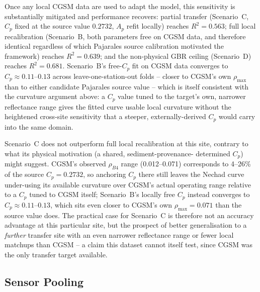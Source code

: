 \documentclass[remotesensing,article,submit,pdftex,moreauthors]{Definitions/mdpi}
\begin{document}
Once any local CGSM data are used to adapt the model, this sensitivity
is substantially mitigated and performance recovers: partial transfer
(Scenario~C, $C_p$ fixed at the source value $0.2732$, $A_p$ refit
locally) reaches $R^2 = 0.563$; full local recalibration (Scenario~B,
both parameters free on CGSM data, and therefore identical regardless
of which Pajarales source calibration motivated the framework) reaches
$R^2 = 0.639$; and the non-physical GBR ceiling (Scenario~D) reaches
$R^2 = 0.681$. Scenario~B's free-$C_p$ fit on CGSM data converges to
$C_p \approx 0.11$--$0.13$ across leave-one-station-out folds --
closer to CGSM's own $\rho_{\max}$ than to either candidate Pajarales
source value -- which is itself consistent with the curvature
argument above: a $C_p$ value tuned to the target's own, narrower
reflectance range gives the fitted curve usable local curvature
without the heightened cross-site sensitivity that a steeper,
externally-derived $C_p$ would carry into the same domain.

Scenario~C does not outperform full local recalibration at this site,
contrary to what its physical motivation (a shared, sediment-provenance-
determined $C_p$) might suggest. CGSM's observed $\rho_{B4}$ range
(0.012--0.071) corresponds to 4--26\% of the source $C_p = 0.2732$,
so anchoring $C_p$ there still leaves the Nechad curve under-using its
available curvature over CGSM's actual operating range relative to a
$C_p$ tuned to CGSM itself; Scenario~B's locally free $C_p$ instead
converges to $C_p \approx 0.11$--$0.13$, which sits even closer to
CGSM's own $\rho_{\max} = 0.071$ than the source value does. The
practical case for
Scenario~C is therefore not an accuracy advantage at this particular
site, but the prospect of better generalisation to a \emph{further}
transfer site with an even narrower reflectance range or fewer local
matchups than CGSM -- a claim this dataset cannot itself test, since
CGSM was the only transfer target available.
 
 
\subsection{Sensor Pooling}
\label{sec:disc_pooling}
 
\end{document}

